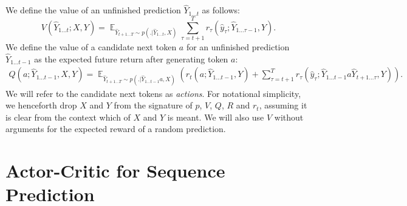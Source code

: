 \documentclass{article} %
\DeclareMathOperator*{\Exp}{\mathbb{E}}
\begin{document}
We define the value of an unfinished
prediction $\hat{Y}_{1 \ldots t}$ as follows:
\begin{equation*}
    V(\hat{Y}_{1 \ldots t}; X, Y) = 
    \Exp_{
        \hat{Y}_{t+1 \ldots T}
        \sim p(.| \hat{Y}_{1 \ldots t}, X)
    } \sum\limits_{\tau=t+1}^T r_{\tau}(\hat{y}_{\tau}; \hat{Y}_{1 \ldots \tau - 1}, Y).
\end{equation*}    
We define the value of a candidate next token $a$ for an unfinished prediction 
$\hat{Y}_{1 \ldots t - 1}$ as the expected future return after generating token $a$: 
\begin{align*}
    Q(a; \hat{Y}_{1 \ldots t - 1}, X, Y) = 
    \Exp_{
        \hat{Y}_{t+1 \ldots T}
        \sim p(.|\hat{Y}_{1 \ldots t - 1} a,  X)
    } 
    \left(
    r_{t}(a; \hat{Y}_{1 \ldots t-1}, Y) + 
    \sum\limits_{\tau=t+1}^{T} 
    r_{\tau}(\hat{y}_{\tau}; \hat{Y}_{1 \ldots t-1} a \hat{Y}_{t+1 \ldots \tau}, Y)
    \right).        
\end{align*}
We will refer to the candidate next tokens as \textit{actions}.
For notational simplicity, we henceforth drop $X$ and $Y$ from the signature
of $p$, $V$, $Q$, $R$ and $r_t$, assuming it is clear from the context which of $X$ and $Y$ is
meant.  We will also use $V$ without arguments for the expected reward of
a random prediction.

\section{Actor-Critic for Sequence Prediction}

\label{sec:actor-critic}
\end{document}
